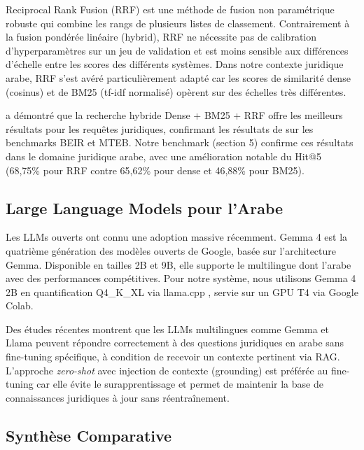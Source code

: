 \noindent Reciprocal Rank Fusion (RRF) \cite{cormack2009reciprocal} est une
méthode de fusion non paramétrique robuste qui combine les rangs de
plusieurs listes de classement. Contrairement à la fusion pondérée linéaire
(hybrid), RRF ne nécessite pas de calibration d'hyperparamètres sur un jeu
de validation et est moins sensible aux différences d'échelle entre les
scores des différents systèmes. Dans notre contexte juridique arabe, RRF
s'est avéré particulièrement adapté car les scores de similarité dense
(cosinus) et de BM25 (tf-idf normalisé) opèrent sur des échelles très
différentes.

\vspace{0.2cm}

\noindent \cite{shao2023hybrid} a démontré que la recherche hybride
Dense + BM25 + RRF offre les meilleurs résultats pour les requêtes
juridiques, confirmant les résultats de \cite{thakur2021hybrid} sur les
benchmarks BEIR et MTEB. Notre benchmark (section 5) confirme ces
résultats dans le domaine juridique arabe, avec une amélioration notable
du Hit@5 (68,75\% pour RRF contre 65,62\% pour dense et 46,88\% pour BM25).

\subsection{Large Language Models pour l'Arabe}

Les LLMs ouverts ont connu une adoption massive récemment. Gemma 4
\cite{google2025gemma4} est la quatrième génération des modèles ouverts
de Google, basée sur l'architecture Gemma. Disponible en tailles 2B et 9B,
elle supporte le multilingue dont l'arabe avec des performances compétitives.
Pour notre système, nous utilisons Gemma 4 2B en quantification Q4\_K\_XL via
llama.cpp \cite{gerganov2023llamacpp}, servie sur un GPU T4 via Google Colab.

\vspace{0.2cm}

\noindent Des études récentes \cite{hendy2023llm} montrent que les LLMs
multilingues comme Gemma et Llama peuvent répondre correctement à des
questions juridiques en arabe sans fine-tuning spécifique, à condition de
recevoir un contexte pertinent via RAG. L'approche \textit{zero-shot} avec
injection de contexte (grounding) est préférée au fine-tuning car elle évite
le surapprentissage et permet de maintenir la base de connaissances
juridiques à jour sans réentraînement.

\subsection{Synthèse Comparative}


